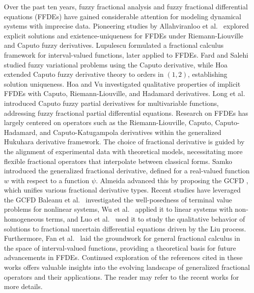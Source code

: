 \documentclass[10pt,a4paper]{amsart}
\numberwithin{equation}{section}
\begin{document}
Over the past ten years, fuzzy fractional analysis and fuzzy fractional differential
equations (FFDEs) have gained considerable attention for modeling dynamical systems with
imprecise data. Pioneering studies by Allahviranloo et al.\ \cite{allah2014}
explored explicit solutions and existence-uniqueness for FFDEs under
Riemann-Liouville and Caputo fuzzy derivatives.
Lupulescu \cite{lupu} formulated a fractional calculus framework for interval-valued
functions, later applied to FFDEs. Fard and Salehi \cite{sal} studied fuzzy variational
problems using the Caputo derivative, while Hoa \cite{hoa2020a} extended Caputo fuzzy
derivative theory to orders in $(1,2)$, establishing solution uniqueness.
Hoa and Vu \cite{hoa2019b} investigated qualitative properties of implicit FFDEs
with Caputo, Riemann-Liouville, and Hadamard derivatives. Long et al.\
\cite{long} introduced Caputo fuzzy partial derivatives for multivariable functions,
addressing fuzzy fractional partial differential equations. Research on FFDEs has
largely centered on operators such as the Riemann-Liouville, Caputo, Caputo-Hadamard,
and Caputo-Katugampola derivatives within the generalized Hukuhara derivative framework.
The choice of fractional derivative is guided by the alignment of experimental data
with theoretical models, necessitating more flexible fractional operators that
interpolate between classical forms. Samko \cite{samk} introduced the generalized
fractional derivative, defined for a real-valued function $ w$ with respect
to a function $\psi$. Almeida \cite{alm} advanced this by proposing the GCFD ,
which unifies various fractional derivative types. Recent studies have leveraged the
GCFD Baleanu et al.\ \cite{bal} investigated the well-posedness of terminal value
problems for nonlinear systems, Wu et al.\ \cite{shiri} applied it to linear
systems with non-homogeneous terms, and Luo et al.\ \cite{luo} used it to study
the qualitative behavior of solutions to fractional uncertain differential equations
driven by the Liu process. Furthermore, Fan et al.\ \cite{Fan} laid the groundwork for
general fractional calculus in the space of interval-valued functions, providing a
theoretical basis for future advancements in FFDEs.
Continued exploration of the references cited in these works offers valuable
insights into the evolving landscape of generalized fractional operators and their
applications. The reader may refer to the recent works
\cite{abbas,ahm1,akd,ali1,ali2,ali3,xi} for more details.
\end{document}
